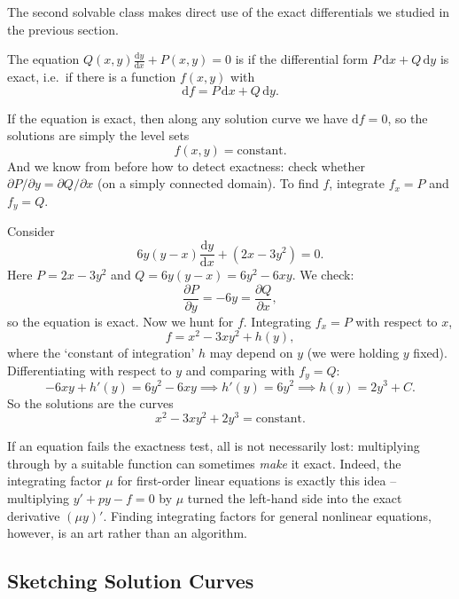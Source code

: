 The second solvable class makes direct use of the exact differentials we studied in the previous section.

\begin{definition}
	The equation $Q(x, y) \frac{\mathrm{d}y}{\mathrm{d}x} + P(x, y) = 0$ is  if the differential form $P \,\mathrm{d}x + Q \,\mathrm{d}y$ is exact, i.e.\ if there is a function $f(x, y)$ with
	$$
	\mathrm{d}f = P\,\mathrm{d}x + Q\,\mathrm{d}y.
	$$
\end{definition}

If the equation is exact, then along any solution curve we have $\mathrm{d}f = 0$, so the solutions are simply the level sets
$$
f(x, y) = \text{constant}.
$$
And we know from before how to detect exactness: check whether $\partial P/\partial y = \partial Q/\partial x$ (on a simply connected domain). To find $f$, integrate $f_x = P$ and $f_y = Q$.

\begin{example}
	Consider
	$$
	6y(y - x) \frac{\mathrm{d}y}{\mathrm{d}x} + (2x - 3y^2) = 0.
	$$
	Here $P = 2x - 3y^2$ and $Q = 6y(y - x) = 6y^2 - 6xy$. We check:
	$$
	\frac{\partial P}{\partial y} = -6y = \frac{\partial Q}{\partial x},
	$$
	so the equation is exact. Now we hunt for $f$. Integrating $f_x = P$ with respect to $x$,
	$$
	f = x^2 - 3xy^2 + h(y),
	$$
	where the `constant of integration' $h$ may depend on $y$ (we were holding $y$ fixed). Differentiating with respect to $y$ and comparing with $f_y = Q$:
	$$
	-6xy + h'(y) = 6y^2 - 6xy \implies h'(y) = 6y^2 \implies h(y) = 2y^3 + C.
	$$
	So the solutions are the curves
	$$
	x^2 - 3xy^2 + 2y^3 = \text{constant}.
	$$
\end{example}

\begin{remark}
	If an equation fails the exactness test, all is not necessarily lost: multiplying through by a suitable function can sometimes \emph{make} it exact. Indeed, the integrating factor $\mu$ for first-order linear equations is exactly this idea -- multiplying $y' + py - f = 0$ by $\mu$ turned the left-hand side into the exact derivative $(\mu y)'$. Finding integrating factors for general nonlinear equations, however, is an art rather than an algorithm.
\end{remark}

\subsection{Sketching Solution Curves}


